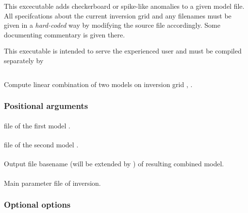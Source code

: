 This excecutable adds checkerboard or spike-like anomalies to a given  model file. All 
specifcations about the current inversion grid and any filenames must be given in a \emph{hard-coded}
way by modifying the source file  accordingly. Some documenting
commentary is given there. 

This executable is intended to serve the experienced user and must be compiled separately by\\
%
\subsection{} \label{programs_scripts,sec:bin_prog,sec:combine_inverted_models}
Compute linear combination      of two models on inversion grid
, .
\subsubsection{Positional arguments}
\paragraph{}
 file of the first model .
\paragraph{}
 file of the second model .
\paragraph{}
Output file basename (will be extended by ) of resulting combined model.
\paragraph{}
Main parameter file of inversion.
\subsubsection{Optional options}
